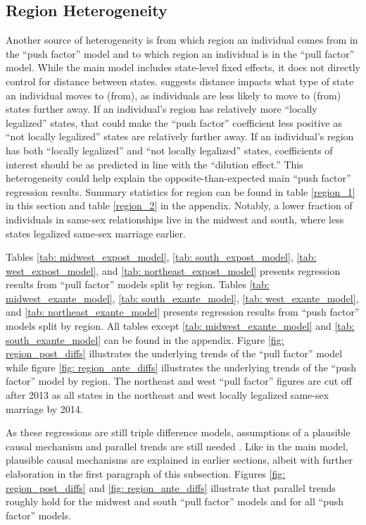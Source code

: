 \documentclass[12pt,letterpaper]{article}
\begin{document}
\clearpage
\subsection{Region Heterogeneity}

Another source of heterogeneity is from which region an individual comes from in the “push factor” model and to which region an individual is in the “pull factor” model. While the main model includes state-level fixed effects, it does not directly control for distance between states. \citep{1} suggests distance impacts what type of state an individual moves to (from), as individuals are less likely to move to (from) states further away. If an individual’s region has relatively more “locally legalized” states, that could make the  “push factor” coefficient less positive as “not locally legalized” states are relatively further away. If an individual’s region has both “locally legalized” and “not locally legalized” states, coefficients of interest should be as predicted in line with the “dilution effect.” This heterogeneity could help explain the opposite-than-expected main “push factor” regression results. Summary statistics for region can be found in table \ref{region_1} in this section and table \ref{region_2} in the appendix. Notably, a lower fraction of individuals in same-sex relationships live in the midwest and south, where less states legalized same-sex marriage earlier.



Tables \ref{tab: midwest_expost_model}, \ref{tab: south_expost_model}, \ref{tab: west_expost_model}, and \ref{tab: northeast_expost_model} presents regression results from “pull factor” models split by region. Tables \ref{tab: midwest_exante_model}, \ref{tab: south_exante_model}, \ref{tab: west_exante_model}, and \ref{tab: northeast_exante_model}  presents regression results from “push factor” models split by region. All tables except \ref{tab: midwest_exante_model} and \ref{tab: south_exante_model} can be found in the appendix. Figure \ref{fig: region_post_diffs} illustrates the underlying trends of the “pull factor” model while figure \ref{fig: region_ante_diffs} illustrates the underlying trends of the “push factor” model by region. The northeast and west “pull factor” figures are cut off after 2013 as all states in the northeast and west locally legalized same-sex marriage by 2014.

As these regressions are still triple difference models, assumptions of a plausible causal mechanism and parallel trends are still needed \citep{24, 25}. Like in the main model, plausible causal mechanisms are explained in earlier sections, albeit with further elaboration in the first paragraph of this subsection. Figures \ref{fig: region_post_diffs} and \ref{fig: region_ante_diffs} illustrate that parallel trends roughly hold for the midwest and south “pull factor” models and for all “push factor” models. 
\end{document}

